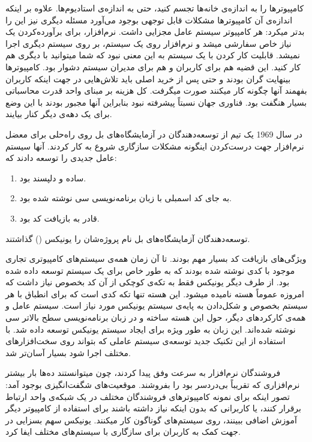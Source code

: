 کامپیوترها را به اندازه‌ی خانه‌ها تجسم کنید، حتی به اندازه‌ی استادیوم‌ها. علاوه بر اینکه اندازه‌ی آن کامپیوترها مشکلات قابل توجهی بوجود می‌آورد مسئله‌ دیگری نیز این را بدتر میکرد: هر کامپیوتر سیستم عامل مجزایی داشت. نرم‌افزار، برای برآورده‌کردن یک نیاز خاص سفارشی میشد و نرم‌افزار روی یک سیستم، بر روی سیستم دیگری اجرا نمیشد. قابلیت کار کردن با یک سیستم به این معنی نبود که شما میتوانید با دیگری هم کار کنید. این قضیه هم برای کاربران و هم برای مدیران سیستم دشوار بود.
کامپیوترها بینهایت گران بودند و حتی پس از خرید اصلی باید تلاش‌هایی در جهت اینکه کاربران بفهمند آنها چگونه کار میکنند صورت میگرفت. کل هزینه‌ بر مبنای واحد قدرت محاسباتی بسیار هنگفت بود.
فناوری جهان نسبتاً پیشرفته نبود بنابراین آنها مجبور بودند با این وضع برای یک دهه‌ی دیگر کنار بیایند.

در سال 1969 یک تیم از توسعه‌دهندگان در آزمایشگاه‌های بل روی راه‌حلی برای معضل نرم‌افزار جهت درست‌کردن اینگونه مشکلات سازگاری شروع به کار کردند. آنها سیستم عامل جدیدی را توسعه دادند که:
\begin{enumerate}
	\item ساده و دلپسند بود.
	\item به جای کد اسمبلی با زبان برنامه‌نویسی سی نوشته شده بود.
	\item  قادر به بازیافت کد بود.
\end{enumerate}

توسعه‌دهندگان آزمایشگاه‌های بل نام پروژه‌شان را یونیکس () گذاشتند.

ویژگی‌های بازیافت کد بسیار مهم بودند. تا آن زمان همه‌ی سیستم‌های کامپیوتری تجاری موجود با کدی نوشته شده بودند که به طور خاص برای یک سیستم توسعه داده شده بود. از طرف دیگر یونیکس فقط به تکه‌ی کوچکی از آن کد بخصوص نیاز داشت که امروزه عموماً هسته نامیده میشود. این هسته تنها تکه کدی است که برای انطباق با هر سیستم بخصوص و شکل‌دادن به پایه‌ی سیستم یونیکس مورد نیاز است. سیستم عامل و همه‌ی کارکردهای دیگر، حول این هسته ساخته و در زبان برنامه‌نویسی سطح بالاتر سی نوشته شده‌اند. این زبان به طور ویژه برای ایجاد سیستم یونیکس توسعه داده شد. با استفاده از این تکنیک جدید توسعه‌ی سیستم عاملی که بتواند روی سخت‌افزارهای مختلف اجرا شود بسیار آسان‌تر شد.

فروشندگان نرم‌افزار به سرعت وفق پیدا کردند، چون میتوانستند ده‌ها بار بیشتر نرم‌افزاری که تقریباً بی‌دردسر بود را بفروشند. موقعیت‌های شگفت‌انگیزی بوجود آمد: تصور اینکه برای نمونه کامپیوترهای فروشندگان مختلف در یک شبکه‌ی واحد ارتباط برقرار کنند، یا کاربرانی که بدون اینکه نیاز داشته باشند برای استفاده از کامپیوتر دیگر آموزش اضافی ببینند، روی سیستم‌های گوناگون کار میکنند. یونیکس سهم بسزایی در جهت کمک به کاربران برای سازگاری با سیستم‌های مختلف ایفا کرد.

